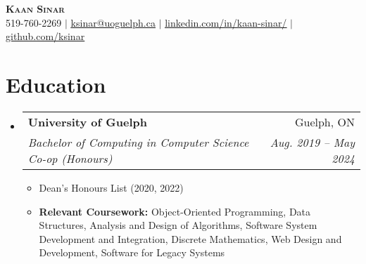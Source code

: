 \documentclass[letterpaper,11pt]{article}
\makeatletter
\newcommand{\resumeItem}[1]{
  \item\small{
    {#1 \vspace{-2pt}}
  }
}
\newcommand{\resumeSubheading}[4]{
  \vspace{-2pt}\item
    \begin{tabular*}{0.97\textwidth}[t]{l@{\extracolsep{\fill}}r}
      \textbf{#1} & #2 \\
      \textit{\small#3} & \textit{\small #4} \\
    \end{tabular*}\vspace{-7pt}
}
\newcommand{\resumeSubHeadingListStart}{\begin{itemize}[leftmargin=0.15in, label={}]}
\newcommand{\resumeSubHeadingListEnd}{\end{itemize}}
\newcommand{\resumeItemListStart}{\begin{itemize}}
\newcommand{\resumeItemListEnd}{\end{itemize}\vspace{-5pt}}
\makeatother
\begin{document}

\begin{center}
    \textbf{\Huge \scshape Kaan Sinar} \\ \vspace{1pt}
    \small 519-760-2269 $|$ \href{mailto:ksinar@uoguelph.ca}{\underline{ksinar@uoguelph.ca}} $|$ 
    \href{https://www.linkedin.com/in/kaan-sinar/}{\underline{linkedin.com/in/kaan-sinar/}} $|$
    \href{https://github.com/ksinar}{\underline{github.com/ksinar}}
\end{center}


\section{Education}
  \resumeSubHeadingListStart
    \resumeSubheading
      {University of Guelph}{Guelph, ON}
      {Bachelor of Computing in Computer Science Co-op (Honours)}{Aug. 2019 -- May 2024}
      \resumeItemListStart
        \resumeItem{Dean's Honours List (2020, 2022)}
        \resumeItem{\textbf{Relevant Coursework:} Object-Oriented Programming, Data Structures, Analysis and Design of Algorithms, Software System Development and Integration, Discrete Mathematics, Web Design and Development, Software for Legacy Systems}
      \resumeItemListEnd
  \resumeSubHeadingListEnd


\end{document}
